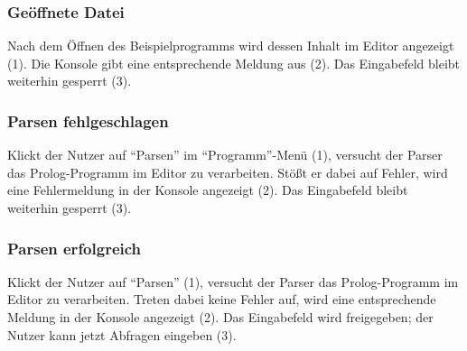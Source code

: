 \documentclass[parskip=full,11pt,twoside]{scrartcl}
\begin{document}
\subsubsection{Geöffnete Datei}

\begin{minipage}{\linewidth}
\end{minipage}

Nach dem Öffnen des Beispielprogramms wird dessen Inhalt im Editor angezeigt (1).
Die Konsole gibt eine entsprechende Meldung aus (2).
Das Eingabefeld bleibt weiterhin gesperrt (3).

\subsubsection{Parsen fehlgeschlagen}

\begin{minipage}{\linewidth}
\end{minipage}

Klickt der Nutzer auf \enquote{Parsen} im \enquote{Programm}-Menü (1), versucht der Parser das Prolog-Programm im Editor zu verarbeiten.
Stößt er dabei auf Fehler, wird eine Fehlermeldung in der Konsole angezeigt (2).
Das Eingabefeld bleibt weiterhin gesperrt (3).

\subsubsection{Parsen erfolgreich}

\begin{minipage}{\linewidth}
\end{minipage}

Klickt der Nutzer auf \enquote{Parsen} (1), versucht der Parser das Prolog-Programm im Editor zu verarbeiten.
Treten dabei keine Fehler auf, wird eine entsprechende Meldung in der Konsole angezeigt (2).
Das Eingabefeld wird freigegeben; der Nutzer kann jetzt Abfragen eingeben (3).
\end{document}
